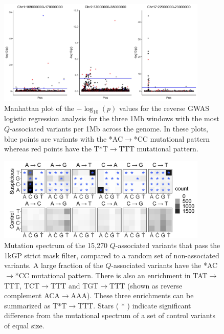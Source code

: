 \documentclass[9pt,article]{template}
\begin{document}
\begin{figure}[tbp]
\centering
\includegraphics[width=10cm,keepaspectratio]{RegionOver10.jpg}
\caption{Manhattan plot of the $-\log_{10}(p)$ values for the reverse GWAS logistic regression analysis for the three 1Mb windows with the most  $Q$-associated variants per 1Mb across the genome. 
In these plots, blue points are variants with the *AC${\rightarrow}$*CC mutational pattern whereas red points have the T*T${\rightarrow}$TTT mutational pattern.}  
\label{Top10}
\end{figure}


\begin{figure}[tbp]
\centering
\includegraphics[width=10cm,keepaspectratio]{strict_gcat_mutational_enrichment.jpg}
\caption{Mutation spectrum of the 15,270 $Q$-associated variants that pass the 1kGP strict mask filter, compared to a random set of non-associated variants. A large fraction of the  $Q$-associated variants have the *AC${\rightarrow}$*CC mutational pattern. There is also an enrichment in TAT${\rightarrow}$TTT, TCT${\rightarrow}$TTT and  TGT${\rightarrow}$TTT (shown as reverse complement  ACA${\rightarrow}$AAA). These three enrichments can be summarized as T*T${\rightarrow}$TTT. Stars ( * ) indicate significant difference from the mutational spectrum of a set of control variants of equal size.}  
\label{strict_gcat_mutational_enrichment}
\end{figure}
\end{document}
